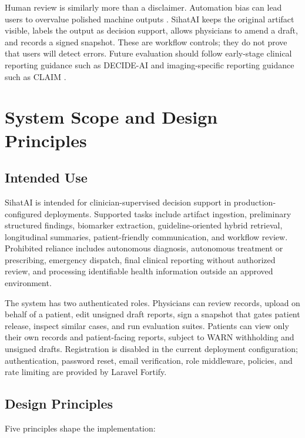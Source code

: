\documentclass[conference]{IEEEtran}
\begin{document}
Human review is similarly more than a disclaimer. Automation bias can lead users to overvalue polished machine outputs \cite{cabitza2017unintended}. SihatAI keeps the original artifact visible, labels the output as decision support, allows physicians to amend a draft, and records a signed snapshot. These are workflow controls; they do not prove that users will detect errors. Future evaluation should follow early-stage clinical reporting guidance such as DECIDE-AI \cite{vasey2022decideai} and imaging-specific reporting guidance such as CLAIM \cite{mongan2020claim}.

\section{System Scope and Design Principles}

\subsection{Intended Use}

SihatAI is intended for clinician-supervised decision support in production-configured deployments. Supported tasks include artifact ingestion, preliminary structured findings, biomarker extraction, guideline-oriented hybrid retrieval, longitudinal summaries, patient-friendly communication, and workflow review. Prohibited reliance includes autonomous diagnosis, autonomous treatment or prescribing, emergency dispatch, final clinical reporting without authorized review, and processing identifiable health information outside an approved environment.

The system has two authenticated roles. Physicians can review records, upload on behalf of a patient, edit unsigned draft reports, sign a snapshot that gates patient release, inspect similar cases, and run evaluation suites. Patients can view only their own records and patient-facing reports, subject to WARN withholding and unsigned drafts. Registration is disabled in the current deployment configuration; authentication, password reset, email verification, role middleware, policies, and rate limiting are provided by Laravel Fortify.

\subsection{Design Principles}

Five principles shape the implementation:
\end{document}
